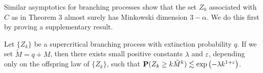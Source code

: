 Similar asymptotics for branching processes show that the set $Z_0$ associated with $C$ as in Theorem 3 almost surely has Minkowski dimension $3 - \alpha$. We do this first by proving a supplementary result.


\begin{lemma}\label{branchingtrick}
	Let $\{ Z_k \}$ be a supercritical branching process with extinction probability $q$. If we set $\tilde{M} = q + M$, then there exists small positive constants $\lambda$ and $\varepsilon$, depending only on the offspring law of $\{ Z_k \}$, such that $\operatorname{\mathbf{P}}(Z_k \geq k \tilde{M}^k) \lesssim \exp \left(-\lambda k^{1 + \varepsilon} \right)$.
\end{lemma}

